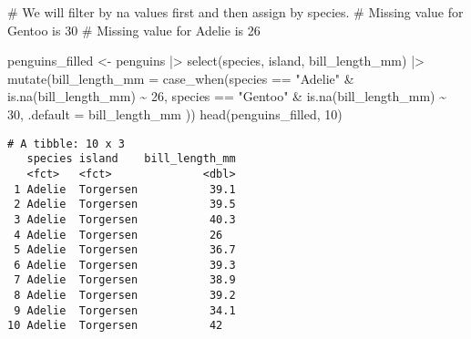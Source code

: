 \documentclass[
  letterpaper,
  DIV=11,
  numbers=noendperiod]{scrartcl}
\newenvironment{Shaded}{\begin{snugshade}}{\end{snugshade}}
\newcommand{\AttributeTok}[1]{\textcolor[rgb]{0.40,0.45,0.13}{#1}}
\newcommand{\CommentTok}[1]{\textcolor[rgb]{0.37,0.37,0.37}{#1}}
\newcommand{\DecValTok}[1]{\textcolor[rgb]{0.68,0.00,0.00}{#1}}
\newcommand{\FunctionTok}[1]{\textcolor[rgb]{0.28,0.35,0.67}{#1}}
\newcommand{\NormalTok}[1]{\textcolor[rgb]{0.00,0.23,0.31}{#1}}
\newcommand{\OtherTok}[1]{\textcolor[rgb]{0.00,0.23,0.31}{#1}}
\newcommand{\SpecialCharTok}[1]{\textcolor[rgb]{0.37,0.37,0.37}{#1}}
\newcommand{\StringTok}[1]{\textcolor[rgb]{0.13,0.47,0.30}{#1}}
\begin{document}
\begin{Shaded}
\begin{Highlighting}[]
\CommentTok{\# We will filter by na values first and then assign by species.}
\CommentTok{\# Missing value for Gentoo is 30}
\CommentTok{\# Missing value for Adelie is 26}

\NormalTok{penguins\_filled }\OtherTok{\textless{}{-}}\NormalTok{ penguins }\SpecialCharTok{|\textgreater{}} \FunctionTok{select}\NormalTok{(species, island, bill\_length\_mm) }\SpecialCharTok{|\textgreater{}} 
  \FunctionTok{mutate}\NormalTok{(}\AttributeTok{bill\_length\_mm =} \FunctionTok{case\_when}\NormalTok{(species }\SpecialCharTok{==} \StringTok{"Adelie"} \SpecialCharTok{\&} \FunctionTok{is.na}\NormalTok{(bill\_length\_mm) }\SpecialCharTok{\textasciitilde{}} \DecValTok{26}\NormalTok{,}
\NormalTok{            species }\SpecialCharTok{==} \StringTok{"Gentoo"} \SpecialCharTok{\&} \FunctionTok{is.na}\NormalTok{(bill\_length\_mm) }\SpecialCharTok{\textasciitilde{}} \DecValTok{30}\NormalTok{,}
            \AttributeTok{.default =}\NormalTok{ bill\_length\_mm}
\NormalTok{            ))}
\FunctionTok{head}\NormalTok{(penguins\_filled, }\DecValTok{10}\NormalTok{)}
\end{Highlighting}
\end{Shaded}

\begin{verbatim}
# A tibble: 10 x 3
   species island    bill_length_mm
   <fct>   <fct>              <dbl>
 1 Adelie  Torgersen           39.1
 2 Adelie  Torgersen           39.5
 3 Adelie  Torgersen           40.3
 4 Adelie  Torgersen           26  
 5 Adelie  Torgersen           36.7
 6 Adelie  Torgersen           39.3
 7 Adelie  Torgersen           38.9
 8 Adelie  Torgersen           39.2
 9 Adelie  Torgersen           34.1
10 Adelie  Torgersen           42  
\end{verbatim}
\end{document}
